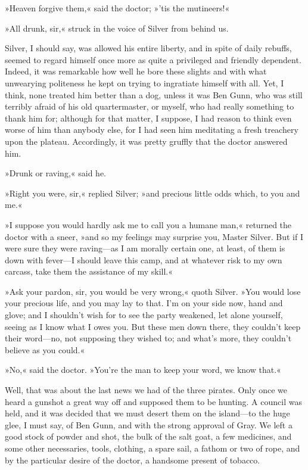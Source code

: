 »Heaven forgive them,« said the doctor; »'tis the mutineers!«

»All drunk, sir,« struck in the voice of Silver from behind us.

Silver, I should say, was allowed his entire liberty, and in spite of daily rebuffs, seemed to regard himself once more as quite a privileged and friendly dependent. Indeed, it was remarkable how well he bore these slights and with what unwearying politeness he kept on trying to ingratiate himself with all. Yet, I think, none treated him better than a dog, unless it was Ben Gunn, who was still terribly afraid of his old quartermaster, or myself, who had really something to thank him for; although for that matter, I suppose, I had reason to think even worse of him than anybody else, for I had seen him meditating a fresh treachery upon the plateau. Accordingly, it was pretty gruffly that the doctor answered him.

»Drunk or raving,« said he.

»Right you were, sir,« replied Silver; »and precious little odds which, to you and me.«

»I suppose you would hardly ask me to call you a humane man,« returned the doctor with a sneer, »and so my feelings may surprise you, Master Silver. But if I were sure they were raving—as I am morally certain one, at least, of them is down with fever—I should leave this camp, and at whatever risk to my own carcass, take them the assistance of my skill.«

»Ask your pardon, sir, you would be very wrong,« quoth Silver. »You would lose your precious life, and you may lay to that. I'm on your side now, hand and glove; and I shouldn't wish for to see the party weakened, let alone yourself, seeing as I know what I owes you. But these men down there, they couldn't keep their word—no, not supposing they wished to; and what's more, they couldn't believe as you could.«

»No,« said the doctor. »You're the man to keep your word, we know that.«

Well, that was about the last news we had of the three pirates. Only once we heard a gunshot a great way off and supposed them to be hunting. A council was held, and it was decided that we must desert them on the island—to the huge glee, I must say, of Ben Gunn, and with the strong approval of Gray. We left a good stock of powder and shot, the bulk of the salt goat, a few medicines, and some other necessaries, tools, clothing, a spare sail, a fathom or two of rope, and by the particular desire of the doctor, a handsome present of tobacco.

